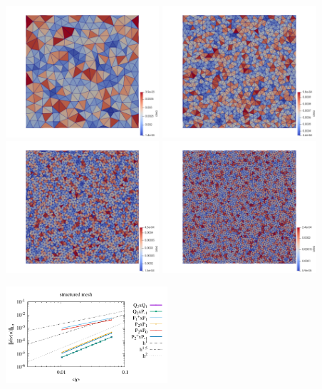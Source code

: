 \begin{center}
\includegraphics[width=5.7cm]{python_codes/fieldstone_120/images/unstructured16}
\includegraphics[width=5.7cm]{python_codes/fieldstone_120/images/unstructured32}\\
\includegraphics[width=5.7cm]{python_codes/fieldstone_120/images/unstructured48}
\includegraphics[width=5.7cm]{python_codes/fieldstone_120/images/unstructured64}
\end{center}

\includegraphics[width=6cm]{python_codes/fieldstone_120/paperresults/dh_structured_errors_divv.pdf}


